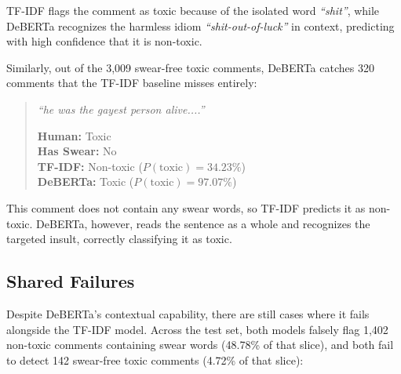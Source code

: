 \documentclass[11pt]{article}
\begin{document}
TF-IDF flags the comment as toxic because of the isolated word
\textit{``shit''}, while DeBERTa recognizes the harmless idiom
\textit{``shit-out-of-luck''} in context, predicting with high
confidence that it is non-toxic.

Similarly, out of the 3,009 swear-free toxic comments,
DeBERTa catches 320 comments that the TF-IDF baseline misses entirely:

\begin{quote}
  \small
  \textit{``he was the gayest person alive....''}
  \par\noindent
  \textbf{Human:} Toxic \\
  \textbf{Has Swear:} No \\
  \textbf{TF-IDF:} Non-toxic ($P(\text{toxic}) = 34.23\%$) \\
  \textbf{DeBERTa:} Toxic ($P(\text{toxic}) = 97.07\%$)
\end{quote}

This comment does not contain any swear words, so TF-IDF predicts it
as non-toxic. DeBERTa, however, reads the sentence as a whole and
recognizes the targeted insult, correctly classifying it as toxic.

\subsection{Shared Failures}

Despite DeBERTa's contextual capability, there are still cases where
it fails alongside the TF-IDF model. Across the test set, both models
falsely flag 1,402 non-toxic comments containing swear words (48.78\%
of that slice), and both fail to detect 142 swear-free toxic comments
(4.72\% of that slice):
\end{document}
